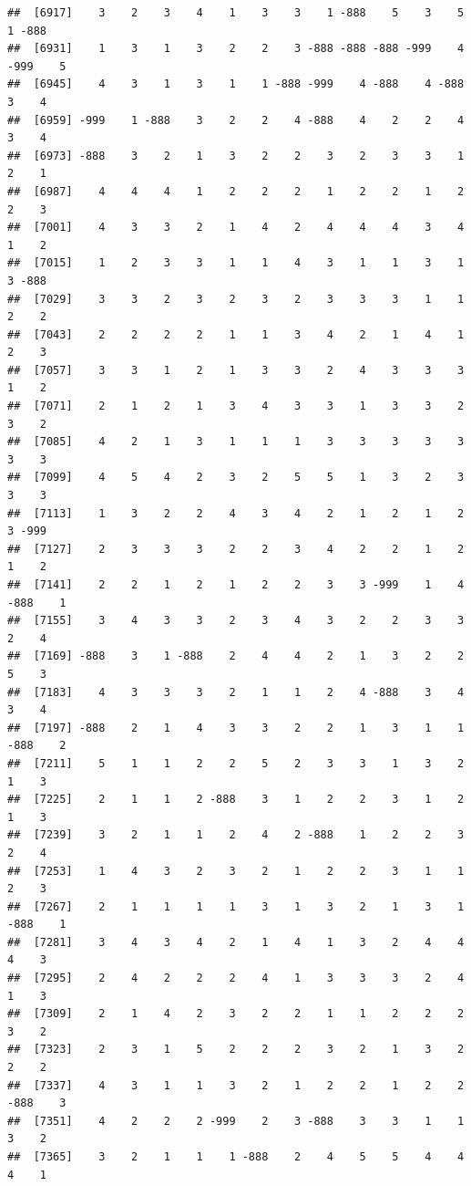 \documentclass[
  12pt,
  openany]{book}
\begin{document}
\begin{verbatim}
##  [6917]    3    2    3    4    1    3    3    1 -888    5    3    5    1 -888
##  [6931]    1    3    1    3    2    2    3 -888 -888 -888 -999    4 -999    5
##  [6945]    4    3    1    3    1    1 -888 -999    4 -888    4 -888    3    4
##  [6959] -999    1 -888    3    2    2    4 -888    4    2    2    4    3    4
##  [6973] -888    3    2    1    3    2    2    3    2    3    3    1    2    1
##  [6987]    4    4    4    1    2    2    2    1    2    2    1    2    2    3
##  [7001]    4    3    3    2    1    4    2    4    4    4    3    4    1    2
##  [7015]    1    2    3    3    1    1    4    3    1    1    3    1    3 -888
##  [7029]    3    3    2    3    2    3    2    3    3    3    1    1    2    2
##  [7043]    2    2    2    2    1    1    3    4    2    1    4    1    2    3
##  [7057]    3    3    1    2    1    3    3    2    4    3    3    3    1    2
##  [7071]    2    1    2    1    3    4    3    3    1    3    3    2    3    2
##  [7085]    4    2    1    3    1    1    1    3    3    3    3    3    3    3
##  [7099]    4    5    4    2    3    2    5    5    1    3    2    3    3    3
##  [7113]    1    3    2    2    4    3    4    2    1    2    1    2    3 -999
##  [7127]    2    3    3    3    2    2    3    4    2    2    1    2    1    2
##  [7141]    2    2    1    2    1    2    2    3    3 -999    1    4 -888    1
##  [7155]    3    4    3    3    2    3    4    3    2    2    3    3    2    4
##  [7169] -888    3    1 -888    2    4    4    2    1    3    2    2    5    3
##  [7183]    4    3    3    3    2    1    1    2    4 -888    3    4    3    4
##  [7197] -888    2    1    4    3    3    2    2    1    3    1    1 -888    2
##  [7211]    5    1    1    2    2    5    2    3    3    1    3    2    1    3
##  [7225]    2    1    1    2 -888    3    1    2    2    3    1    2    1    3
##  [7239]    3    2    1    1    2    4    2 -888    1    2    2    3    2    4
##  [7253]    1    4    3    2    3    2    1    2    2    3    1    1    2    3
##  [7267]    2    1    1    1    1    3    1    3    2    1    3    1 -888    1
##  [7281]    3    4    3    4    2    1    4    1    3    2    4    4    4    3
##  [7295]    2    4    2    2    2    4    1    3    3    3    2    4    1    3
##  [7309]    2    1    4    2    3    2    2    1    1    2    2    2    3    2
##  [7323]    2    3    1    5    2    2    2    3    2    1    3    2    2    2
##  [7337]    4    3    1    1    3    2    1    2    2    1    2    2 -888    3
##  [7351]    4    2    2    2 -999    2    3 -888    3    3    1    1    3    2
##  [7365]    3    2    1    1    1 -888    2    4    5    5    4    4    4    1

\end{verbatim}
\end{document}
